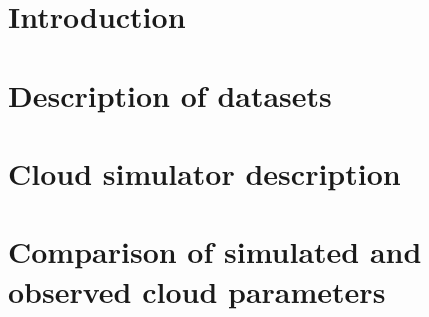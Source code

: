 \documentclass[a4paper,11pt]{article}
\begin{document}
\title{\doctitle}
\author{\docauthor}
\date{\today}
\maketitle
\tableofcontents


\newpage
\section{Introduction}\label{sec:intro}


\newpage
\section{Description of datasets}\label{sec:datasets}


\newpage
\section{Cloud simulator description}\label{sec:sim}
% 


\section{Comparison of simulated and observed cloud parameters}\label{sec:sim_vs_obs}
%
%
%
%
%
%

\newpage
{}

%
 
\end{document}
